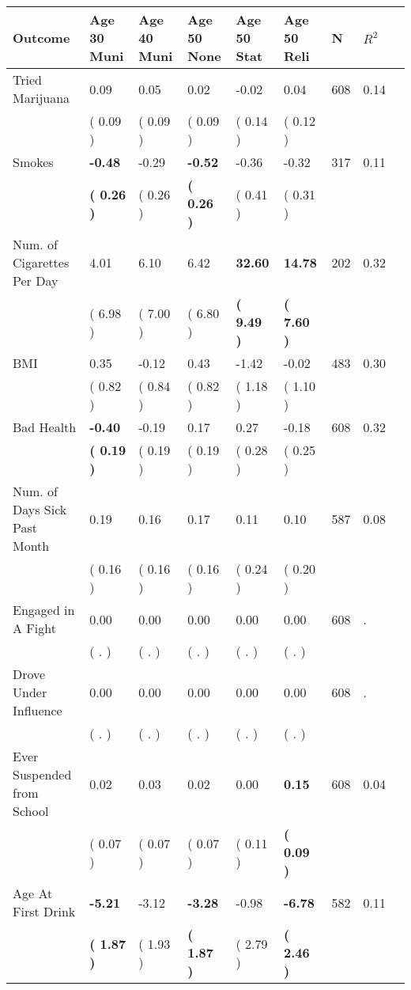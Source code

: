 \begin{tabular}{L{6.2cm} C{1.8cm} C{1.8cm} C{1.8cm} C{1.8cm} C{1.8cm} C{1.8cm} C{0.3cm} C{0.3cm}}
\toprule
 \textbf{Outcome} & \textbf{Age 30 Muni} & \textbf{Age 40 Muni} & \textbf{Age 50 None} & \textbf{Age 50 Stat} & \textbf{Age 50 Reli} & \textbf{N} & \textbf{$ R^2$} \\
\midrule
Tried Marijuana &      0.09 &      0.05 &      0.02 &     -0.02 &      0.04  & 608 &       0.14 \\ 
 & (     0.09 ) & (     0.09 ) & (     0.09 ) & (     0.14 ) & (     0.12 )  & \\
Smokes & \textbf{    -0.48} &     -0.29 & \textbf{    -0.52} &     -0.36 &     -0.32  & 317 &       0.11 \\ 
 & \textbf{(     0.26 )} & (     0.26 ) & \textbf{(     0.26 )} & (     0.41 ) & (     0.31 )  & \\
Num. of Cigarettes Per Day &      4.01 &      6.10 &      6.42 & \textbf{    32.60} & \textbf{    14.78}  & 202 &       0.32 \\ 
 & (     6.98 ) & (     7.00 ) & (     6.80 ) & \textbf{(     9.49 )} & \textbf{(     7.60 )}  & \\
BMI &      0.35 &     -0.12 &      0.43 &     -1.42 &     -0.02  & 483 &       0.30 \\ 
 & (     0.82 ) & (     0.84 ) & (     0.82 ) & (     1.18 ) & (     1.10 )  & \\
Bad Health & \textbf{    -0.40} &     -0.19 &      0.17 &      0.27 &     -0.18  & 608 &       0.32 \\ 
 & \textbf{(     0.19 )} & (     0.19 ) & (     0.19 ) & (     0.28 ) & (     0.25 )  & \\
Num. of Days Sick Past Month &      0.19 &      0.16 &      0.17 &      0.11 &      0.10  & 587 &       0.08 \\ 
 & (     0.16 ) & (     0.16 ) & (     0.16 ) & (     0.24 ) & (     0.20 )  & \\
Engaged in A Fight &      0.00 &      0.00 &      0.00 &      0.00 &      0.00  & 608 &          . \\ 
 & (        . ) & (        . ) & (        . ) & (        . ) & (        . )  & \\
Drove Under Influence &      0.00 &      0.00 &      0.00 &      0.00 &      0.00  & 608 &          . \\ 
 & (        . ) & (        . ) & (        . ) & (        . ) & (        . )  & \\
Ever Suspended from School &      0.02 &      0.03 &      0.02 &      0.00 & \textbf{     0.15}  & 608 &       0.04 \\ 
 & (     0.07 ) & (     0.07 ) & (     0.07 ) & (     0.11 ) & \textbf{(     0.09 )}  & \\
Age At First Drink & \textbf{    -5.21} &     -3.12 & \textbf{    -3.28} &     -0.98 & \textbf{    -6.78}  & 582 &       0.11 \\ 
 & \textbf{(     1.87 )} & (     1.93 ) & \textbf{(     1.87 )} & (     2.79 ) & \textbf{(     2.46 )}  & \\
\bottomrule
\end{tabular}
